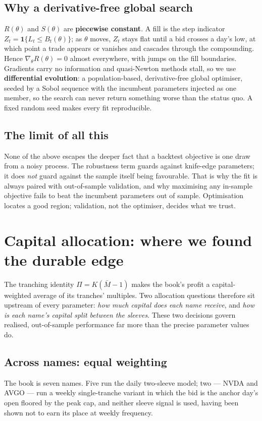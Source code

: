 \documentclass[11pt]{article}
\begin{document}
\subsection{Why a derivative-free global search}
$R(\theta)$ and $S(\theta)$ are \textbf{piecewise constant}. A fill is the step indicator
$Z_t=\mathbf 1\{L_t\le B_t(\theta)\}$; as $\theta$ moves, $Z_t$ stays flat until a bid crosses a
day's low, at which point a trade appears or vanishes and cascades through the compounding. Hence
$\nabla_\theta R(\theta)=0$ almost everywhere, with jumps on the fill boundaries. Gradients carry
no information and quasi-Newton methods stall, so we use \textbf{differential evolution}: a
population-based, derivative-free global optimiser, seeded by a Sobol sequence with the incumbent
parameters injected as one member, so the search can never return something worse than the status
quo. A fixed random seed makes every fit reproducible.

\subsection{The limit of all this}
None of the above escapes the deeper fact that a backtest objective is one draw from a noisy
process. The robustness term guards against knife-edge parameters; it does \emph{not} guard
against the sample itself being favourable. That is why the fit is always paired with
out-of-sample validation, and why maximising any in-sample objective fails to beat the incumbent
parameters out of sample. Optimisation locates a good region; validation, not the optimiser,
decides what we trust.

\section{Capital allocation: where we found the durable edge}\label{sec:alloc}

The tranching identity $\Pi=K(\bar M-1)$ makes the book's profit a capital-weighted average of
its tranches' multiples. Two allocation questions therefore sit upstream of every parameter:
\emph{how much capital does each name receive}, and \emph{how is each name's capital split
between the sleeves}. These two decisions govern realised, out-of-sample performance far more
than the precise parameter values do.

\subsection{Across names: equal weighting}
The book is seven names. Five run the daily two-sleeve model; two --- NVDA and AVGO --- run a
weekly single-tranche variant in which the bid is the anchor day's open floored by the peak cap,
and neither sleeve signal is used, having been shown not to earn its place at weekly frequency.
\end{document}
